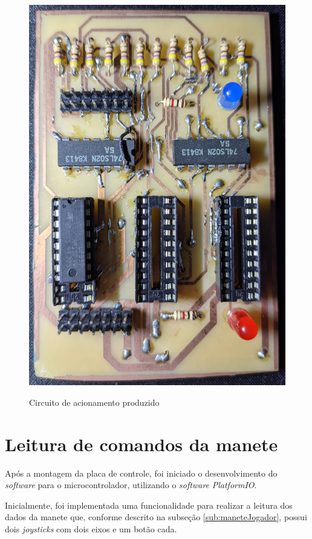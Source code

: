 \begin{figure}[H]
\begin{minipage}{.45\textwidth}
        \centering
        \caption{Circuito de acionamento produzido}
        \includegraphics[keepaspectratio=true, width=0.95\linewidth]
            {img/placa-controle.jpg}
        \label{fig:circuitoAcionamento}
    \end{minipage}
\end{figure}

\section[Leitura de comandos da manete]{Leitura de comandos da manete}
\label{sec:leituraComandosManete}

Após a montagem da placa de controle, foi iniciado o desenvolvimento do \textit{software} para o microcontrolador,
utilizando o \textit{software} \textit{PlatformIO}.

Inicialmente, foi implementada uma funcionalidade para realizar a leitura dos dados da manete que, 
conforme descrito na subseção \ref{sub:maneteJogador}, possui dois \textit{joysticks} com dois eixos e um botão cada.

